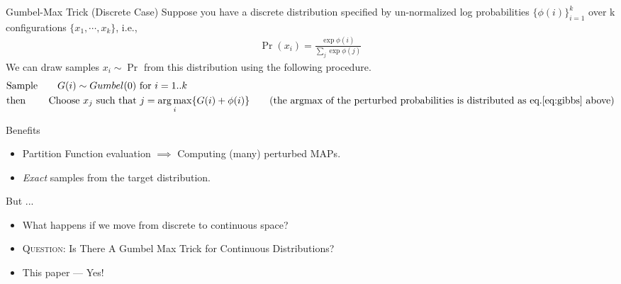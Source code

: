 
\begin{frame}{Gumbel-Max Trick (Discrete Case)}
  Suppose you have a discrete distribution specified by un-normalized log probabilities $\{\phi(i)\}_{i=1}^{k}$ over k configurations $\{x_1,\cdots,x_k\}$, i.e.,
  \begin{align}
    \Pr(x_i) = \frac{\exp\phi(i)}{\sum_j\exp\phi(j)} \label{eq:gibbs}
  \end{align}
  We can draw samples $x_i \sim \Pr$ from this distribution using the following procedure.
  \begin{align*}
    & \text{Sample} \qquad G(i) \sim Gumbel(0) \text{ for } i=1..k\\
    & \text{then} \qquad \text{ Choose } x_j \text{ such that } j= \argmax_i \{G(i) +\phi(i)\} \tag{the argmax of the perturbed probabilities is distributed as eq.\ref{eq:gibbs} above}
  \end{align*}

\end{frame}
\begin{frame}{Benefits} %
  \begin{itemize}
  \item Partition Function evaluation $\implies$ Computing (many) perturbed MAPs. %
  \item \emph{Exact} samples from the target distribution. %
  \end{itemize}
  But ...
  \begin{itemize}
  \item What happens if we move from discrete to continuous space?
  \item \textsc{Question:} Is There A Gumbel Max Trick for Continuous Distributions? %
    \pause
  \item {\color{red} This paper --- Yes!}
  \end{itemize}
\end{frame}

